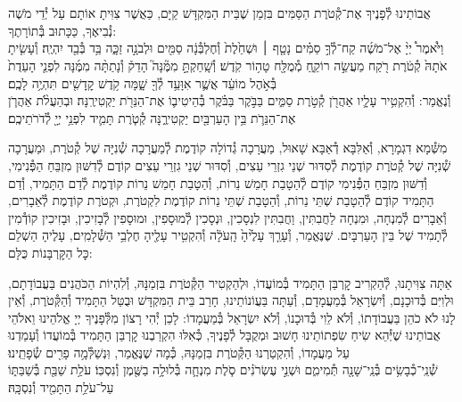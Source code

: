 \documentclass[twoside, openany, parskip=half, 11pt]{book}
\begin{document}
\newcommand{\ketoret}{
\firstword{אַתָּה הוּא יְיָ אֱלֹהֵינוּ שֶׁהִקְטִירוּ}
אֲבוֹתֵינוּ לְ֯פָנֶיךָ אֶת־קְ֯טֹרֶת הַסַּמִּים בִּזְמַן שֶׁבֵּית הַמִּקְדָּשׁ קַיָּם, כַּאֲשֶׁר צִוִּיתָ אוֹתָם עַל יְ֯דֵי מֹשֶׁה נְ֯בִיאֶךָ, כַּכָּתוּב בְּ֯תוֹרָתֶךָ:\\
וַיֹּ֩אמֶר֩ יְיָ֨ אֶל־מֹשֶׁ֜ה קַח־לְ֯ךָ֣ סַמִּ֗ים\source{שמות ל} נָטָ֤ף ׀ וּשְׁחֵ֙לֶת֙ וְ֯חֶלְבְּ֯נָ֔ה סַמִּ֖ים וּלְבֹנָ֣ה זַכָּ֑ה בַּ֥ד בְּ֯בַ֖ד יִהְיֶֽה׃ וְ֯עָשִׂ֤יתָ אֹתָהּ֙ קְ֯טֹ֔רֶת רֹ֖קַח מַעֲשֵׂ֣ה רוֹקֵ֑חַ מְ֯מֻלָּ֖ח טָה֥וֹר קֹֽדֶשׁ׃ וְ֯שָֽׁחַקְתָּ֣ מִמֶּ֘נָּה֮ הָדֵק֒ וְ֯נָתַתָּ֨ה מִמֶּ֜נָּה לִפְנֵ֤י הָעֵדֻת֙ בְּ֯אֹ֣הֶל מוֹעֵ֔ד אֲשֶׁ֛ר אִוָּעֵ֥ד לְ֯ךָ֖ שָׁ֑מָּה קֹ֥דֶשׁ קׇֽדָשִׁ֖ים תִּהְיֶ֥ה לָכֶֽם׃\\
וְ֯נֶאֱמַר: וְ֯הִקְטִ֥יר עָלָ֛יו אַהֲרֹ֖ן קְ֯טֹ֣רֶת סַמִּ֑ים בַּבֹּ֣קֶר בַּבֹּ֗קֶר בְּ֯הֵיטִיב֛וֹ אֶת־הַנֵּרֹ֖ת יַקְטִירֶֽנָּה׃ וּבְהַעֲלֹ֨ת אַהֲרֹ֧ן אֶת־הַנֵּרֹ֛ת בֵּ֥ין הָעַרְבַּ֖יִם יַקְטִירֶ֑נָּה קְ֯טֹ֧רֶת תָּמִ֛יד לִפְנֵ֥י יְיָ֖ לְ֯דֹרֹתֵיכֶֽם׃


}
\\
\tamid
\\
\ketoret
{}  מִשְּׁ֯מָא דִגְמָרָא, וְ֯אַלִּבָּא דְ֯אַבָּא שָׁאוּל, מַעֲרָכָה גְ֯דוֹלָה קוֹדֶמֶת לְ֯מַעֲרָכָה שְׁ֯נִיָּה שֶׁל קְ֯טֹרֶת, וּמַעֲרָכָה שְׁ֯נִיָּה שֶׁל קְ֯טֹרֶת קוֹדֶמֶת לְ֯סִדּוּר שְׁנֵי גִזְרֵי עֵצִים, וְ֯סִדּוּר שְׁנֵי גִזְרֵי עֵצִים קוֹדֶם לְ֯דִשּׁוּן מִזְבֵּחַ הַפְּ֯נִימִי, וְ֯דִשּׁוּן מִזְבֵּחַ הַפְּ֯נִימִי קוֹדֶם לְ֯הַטָבַת חָמֵשׁ נֵרוֹת, וְ֯הַטָבַת חָמֵשׁ נֵרוֹת קוֹדֶמֶת לְ֯דַם הַתָּמִיד, וְ֯דַם הַתָּמִיד קוֹדֶם לְ֯הַטָבַת שְׁתֵּי נֵרוֹת, וְ֯הַטָבַת שְׁתֵּי נֵרוֹת קוֹדֶמֶת לִקְטֹרֶת, וּקְטֹרֶת קוֹדֶמֶת לְ֯אֵבָרִים, וְ֯אֵבָרִים לְ֯מִנְחָה, וּמִנְחָה לַחֲבִתִּין, וַחֲבִתִּין לִנְסָכִין, וּנְסָכִין לְ֯מוּסָפִין, וּמוּסָפִין לְ֯בָזִיכִין, וּבָזִיכִין קוֹדְ֯מִין לְ֯תָמִיד שֶׁל בֵּין הָעַרְבָּיִם. שֶׁנֶּאֱמַר, וְ֯עָרַ֤ךְ  עָלֶ֙יהָ֙ הָֽעֹלָ֔ה וְ֯הִקְטִ֥יר עָלֶ֖יהָ חֶלְבֵ֥י הַשְּׁ֯לָמִֽים׃, עָלֶיהָ הַשְׁלֵם כׇּל הַקׇּרְבָּנוֹת כֻּלָּם:

 אַתָּה צִוִּיתָנוּ, לְ֯הַקְרִיב קׇרְבַּן הַתָּמִיד בְּ֯מוֹעֲדוֹ, וּלְהַקְטִיר הַקְּ֯טֹרֶת בִּזְמַנָּהּ, וְ֯לִהְיוֹת הַכֹּהֲנִים בַּעֲבוֹדָתָם, וּלְוִיִּם בְּ֯דוּכָנָם, וְ֯יִשְׂרָאֵל בְּ֯מַעֲמָדָם, וְ֯עַתָּה בַּעֲוֹנוֹתֵינוּ, חָרַב בֵּית הַמִּקְדָּשׁ וּבֻטַּל הַתָּמִיד וְ֯הַקְּ֯טֹרֶת, וְ֯אֵין לָנוּ לֹא כֹהֵן בַּעֲבוֹדָתוֹ, וְ֯לֹא לֵוִי בְּ֯דוּכָנוֹ, וְ֯לֹא יִשְׂרָאֵל בְּ֯מַעֲמָדוֹ: לָכֵן יְ֯הִי רָצוֹן מִלְּ֯פָנֶיךָ יְיָ אֱלֹהֵינוּ וֵאלֹהֵי אֲבוֹתֵינוּ שֶׁיְּ֯הֵא שִׂיחַ שִׂפְתוֹתֵינוּ חָשׁוּב וּמְקֻבָּל לְ֯פָנֶיךָ, כְּ֯אִלּוּ הִקְרַבְנוּ קׇרְבַּן הַתָּמִיד בְּ֯מוֹעֲדוֹ וְ֯עָמַדְנוּ עַל מַעֲמָדוֹ, וְ֯הִקְטַרְנוּ הַקְּ֯טֹרֶת בִּזְמַנָּהּ, כְּ֯מָה שֶׁנֶּאֱמַר, וּֽנְשַׁלְּ֯מָ֥ה  פָרִ֖ים שְׂ֯פָתֵֽינוּ׃\\
\shabbos
{}
שְׁ֯נֵֽי־כְ֯בָשִׂ֥ים בְּ֯נֵֽי־שָׁנָ֖ה תְּ֯מִימִ֑ם וּשְׁנֵ֣י עֶשְׂרֹנִ֗ים סֹ֧לֶת מִנְחָ֛ה בְּ֯לוּלָ֥ה בַשֶּׁ֖מֶן וְ֯נִסְכּֽוֹ׃
עֹלַ֥ת שַׁבַּ֖ת בְּ֯שַׁבַּתּ֑וֹ עַל־עֹלַ֥ת הַתָּמִ֖יד וְ֯נִסְכָּֽהּ׃
\end{document}
